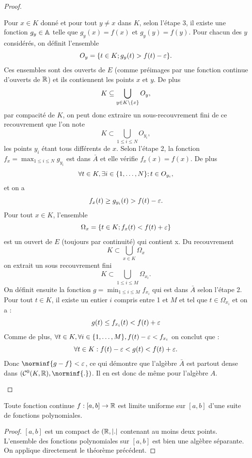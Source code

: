 \begin{proof}
\begin{enumerate}[start=1,label={\bfseries Etape~\arabic* :}, wide, labelwidth=!, labelindent=0pt]
Pour $x \in K$ donné et pour tout $y \neq x$ dans $K$, selon l'étape 3, il existe une fonction $g_y \in \mathbb{A}$ telle que
$g_y(x)=f(x)$ et $g_y(y)=f(y)$. Pour chacun des $y$ considérés, on définit l'ensemble 
\[ O_y = \{ t \in K ; g_y(t) > f(t) - \varepsilon  \} . \]
Ces ensembles sont des ouverts de $E$ (comme préimages par une fonction continue d'ouverts de $\mathbb{R}$) 
et ils contiennent les points $x$ et $y$. De plus 
\[ K \subseteq \bigcup_{y \in K \setminus \{ x \}} O_y, \]
par compacité de $K$, on peut donc extraire un sous-recouvrement fini de ce recouvrement que l'on note 
\[ K \subset \bigcup_{1 \leq i \leq N} O_{y_i} , \]
les points $y_i$ étant tous différents de $x$.
Selon l'étape 2, la fonction $f_x = \max_{1 \leq i \leq N} g_{y_i}$ est dans $\bar A$ et elle vérifie $f_x(x)=f(x)$. De plus 
\[ \forall t \in K, \exists i \in \{ 1, \dots, N \} ; t \in O_{y_i} , \]
et on a 
\[ f_x(t) \geq g_{y_i}(t) > f(t) - \varepsilon . \]
Pour tout $x \in K$, l'ensemble 
\[ \Omega_x = \{ t \in K ; f_x(t) < f(t) + \varepsilon  \} \] 
est un ouvert de $E$ (toujours par continuité) qui contient x. Du recouvrement
\[ K \subset \bigcup_{x \in K} \Omega_x \]
on extrait un sous recouvrement fini 
\[ K \subset \bigcup_{1 \leq i \leq M} \Omega_{x_i} . \]
On définit ensuite la fonction $g = \min_{1 \leq i \leq M} f_{x_i}$ qui est dans $\bar A$ selon l'étape 2.
Pour tout $t \in K$, il existe un entier $i$ compris entre 1 et $M$ et tel que $t \in \Omega_{x_i}$ et on a :
\[ g(t) \leq f_{x_i}(t) < f(t) + \varepsilon \]
Comme de plus, $\forall t \in K, \forall i \in \{ 1, \dots, M \}, f(t) - \varepsilon < f_{x_i}$ on conclut que :
\[ \forall t \in K :  f(t) - \varepsilon < g(t) <  f(t) + \varepsilon . \]
Donc $\norminf{g-f} < \veps$, ce qui démontre que l'algèbre $\bar A$ est partout dense dans $(\C^0(K, \R), \norminf{.})$.
Il en est donc de même pour l'algèbre $A$.
\end{enumerate}
\end{proof}

\begin{coro}
Toute fonction continue $f:[a,b] \to \mathbb{R}$ est limite uniforme sur $[a,b]$ d'une suite de fonctions polynomiales.
\end{coro}

\begin{proof}
$[a,b]$ est un compact de $(\mathbb{R}, \lvert.\rvert$ contenant au moins deux points.
L'ensemble des fonctions polynomiales sur $[a,b]$ est bien une algèbre séparante.
On applique directement le théorème précédent.
\end{proof}

